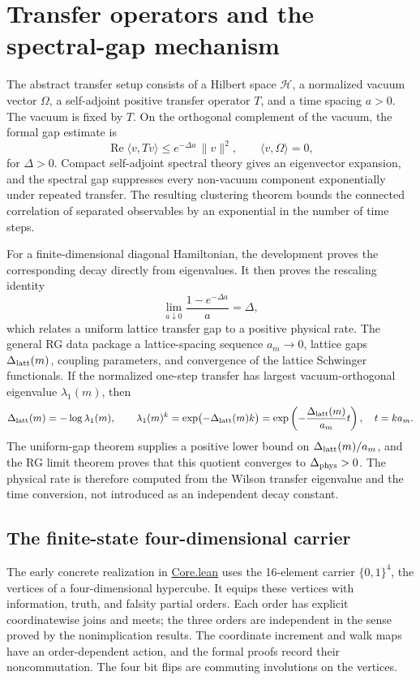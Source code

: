 \documentclass[11pt]{article}
\numberwithin{equation}{section}
\newcommand{\Lean}[1]{\url{#1}}
\begin{document}
\section{Transfer operators and the spectral-gap mechanism}

The abstract transfer setup consists of a Hilbert space \(\mathcal H\), a normalized vacuum vector \(\Omega\), a self-adjoint positive transfer operator \(T\), and a time spacing \(a>0\). The vacuum is fixed by \(T\). On the orthogonal complement of the vacuum, the formal gap estimate is
\[
  \operatorname{Re}\langle v,Tv\rangle
  \leq e^{-\Delta a}\,\|v\|^2,
  \qquad \langle v,\Omega\rangle=0,
\]
for \(\Delta>0\). Compact self-adjoint spectral theory gives an eigenvector expansion, and the spectral gap suppresses every non-vacuum component exponentially under repeated transfer. The resulting clustering theorem bounds the connected correlation of separated observables by an exponential in the number of time steps.

For a finite-dimensional diagonal Hamiltonian, the development proves the corresponding decay directly from eigenvalues. It then proves the rescaling identity
\[
  \lim_{a\downarrow0}\frac{1-e^{-\Delta a}}{a}=\Delta,
\]
which relates a uniform lattice transfer gap to a positive physical rate. The general RG data package a lattice-spacing sequence \(a_m\to0\), lattice gaps \(\Delta_{\rm latt}(m)\), coupling parameters, and convergence of the lattice Schwinger functionals. If the normalized one-step transfer has largest vacuum-orthogonal eigenvalue \(\lambda_1(m)\), then
\[
  \Delta_{\rm latt}(m)=-\log\lambda_1(m),\qquad
  \lambda_1(m)^k=\exp\bigl(-\Delta_{\rm latt}(m)k\bigr)
  =\exp\left(-\frac{\Delta_{\rm latt}(m)}{a_m}t\right),
  \quad t=k a_m.
\]
The uniform-gap theorem supplies a positive lower bound on \(\Delta_{\rm latt}(m)/a_m\), and the RG limit theorem proves that this quotient converges to \(\Delta_{\rm phys}>0\). The physical rate is therefore computed from the Wilson transfer eigenvalue and the time conversion, not introduced as an independent decay constant.

\subsection{The finite-state four-dimensional carrier}

The early concrete realization in \Lean{Core.lean} uses the 16-element carrier \(\{0,1\}^4\), the vertices of a four-dimensional hypercube. It equips these vertices with information, truth, and falsity partial orders. Each order has explicit coordinatewise joins and meets; the three orders are independent in the sense proved by the nonimplication results. The coordinate increment and walk maps have an order-dependent action, and the formal proofs record their noncommutation. The four bit flips are commuting involutions on the vertices.
\end{document}
